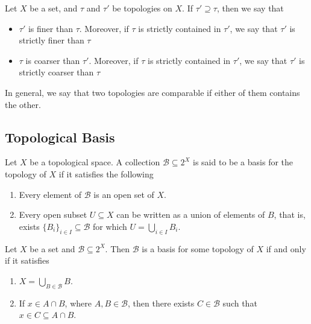 \begin{definition}
\label{def:coarser-finer-topology}
Let \(X\) be a set, and \(\tau\) and \(\tau'\) be topologies on
\(X\). If \(\tau' \supseteq \tau\), then we say that
\begin{itemize}\setlength\itemsep{0em}
\item \(\tau'\) is finer than \(\tau\). Moreover, if \(\tau\)
  is strictly contained in \(\tau'\), we say that \(\tau'\) is
  strictly finer than \(\tau\)

\item \(\tau\) is coarser than \(\tau'\). Moreover, if \(\tau\)
  is strictly contained in \(\tau'\), we say that \(\tau'\) is
  strictly coarser than \(\tau\)
\end{itemize}
In general, we say that two topologies are comparable if either of them contains
the other.
\end{definition}

\subsection{Topological Basis}

\begin{definition}[Basis]\label{def: base}
Let \(X\) be a topological space. A collection \(\mathcal B \subseteq 2^X\) is
said to be a basis for the topology of \(X\) if it satisfies the following
\begin{enumerate}[(B1)]\setlength\itemsep{0em}
  \item Every element of \(\mathcal B\) is an open set of \(X\).
  \item Every open subset \(U \subseteq X\) can be written as a union of
    elements of \(B\), that is, exists \(\{B_i\}_{i \in I} \subseteq \mathcal
    B\) for which \(U = \bigcup_{i \in  I} B_i\).
\end{enumerate}
\end{definition}

\begin{proposition}
\label{prop:equivalent-basis}
Let \(X\) be a set and \(\mathcal B \subseteq 2^X\). Then \(\mathcal B\) is a
basis for some topology of \(X\) if and only if it satisfies
\begin{enumerate}[B1]\setlength\itemsep{0em}
\item\label{item:basis-union-property}
  \(X = \bigcup_{B \in \mathcal B} B\).

\item\label{item:basis-intersection-property}
  If \(x \in A \cap B\), where \(A, B \in \mathcal B\), then there exists
  \(C \in \mathcal B\) such that \(x \in C \subseteq A \cap B\).
\end{enumerate}
\end{proposition}

